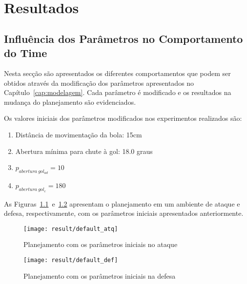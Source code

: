 \chapter{Resultados}\label{cap:resultados}



\section{Influência dos Parâmetros no Comportamento do Time}

Nesta secção são apresentados os diferentes comportamentos que podem ser obtidos
através da modificação dos parâmetros apresentados no
Capítulo~\ref{cap:modelagem}.  Cada parâmetro é modificado e os resultados na
mudança do planejamento são evidenciados.

Os valores iniciais dos parâmetros modificados nos experimentos realizados são:

\begin{enumerate}
  \item Distância de movimentação da bola: 15cm
  \item Abertura mínima para chute à gol: 18.0 graus
  \item $p_{abertura{\ }gol_{ad}} = 10$
  \item $p_{abertura{\ }gol_{c}} = 180$
\end{enumerate}

As Figuras~\ref{fig:default_atq}~e~\ref{fig:default_def} apresentam o
planejamento em um ambiente de ataque e defesa, respectivamente, com os
parâmetros iniciais apresentados anteriormente.

\begin{figure}[H]
  \centering
  \texttt{[image: result/default\_atq]}
  \caption{Planejamento com os parâmetros iniciais no
           ataque}\label{fig:default_atq}
\end{figure}
\begin{figure}[H]
  \centering
  \texttt{[image: result/default\_def]}
  \caption{Planejamento com os parâmetros iniciais
           na defesa}\label{fig:default_def}
\end{figure}

